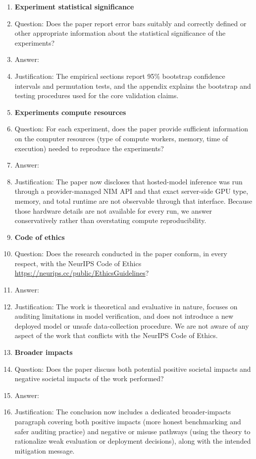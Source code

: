 \begin{enumerate}
\item {\bf Experiment statistical significance}
    \item[] Question: Does the paper report error bars suitably and correctly defined or other appropriate information about the statistical significance of the experiments?
    \item[] Answer: \answerYes{}
    \item[] Justification: The empirical sections report 95\% bootstrap confidence intervals and permutation tests, and the appendix explains the bootstrap and testing procedures used for the core validation claims.

\item {\bf Experiments compute resources}
    \item[] Question: For each experiment, does the paper provide sufficient information on the computer resources (type of compute workers, memory, time of execution) needed to reproduce the experiments?
    \item[] Answer: \answerNo{}
    \item[] Justification: The paper now discloses that hosted-model inference was run through a provider-managed NIM API and that exact server-side GPU type, memory, and total runtime are not observable through that interface. Because those hardware details are not available for every run, we answer conservatively rather than overstating compute reproducibility.

\item {\bf Code of ethics}
    \item[] Question: Does the research conducted in the paper conform, in every respect, with the NeurIPS Code of Ethics \url{https://neurips.cc/public/EthicsGuidelines}?
    \item[] Answer: \answerYes{}
    \item[] Justification: The work is theoretical and evaluative in nature, focuses on auditing limitations in model verification, and does not introduce a new deployed model or unsafe data-collection procedure. We are not aware of any aspect of the work that conflicts with the NeurIPS Code of Ethics.

\item {\bf Broader impacts}
    \item[] Question: Does the paper discuss both potential positive societal impacts and negative societal impacts of the work performed?
    \item[] Answer: \answerYes{}
    \item[] Justification: The conclusion now includes a dedicated broader-impacts paragraph covering both positive impacts (more honest benchmarking and safer auditing practice) and negative or misuse pathways (using the theory to rationalize weak evaluation or deployment decisions), along with the intended mitigation message.


\end{enumerate}
